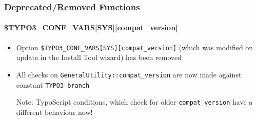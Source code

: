 %

\begin{frame}[fragile]
	\frametitle{Deprecated/Removed Functions}
	\framesubtitle{\$TYPO3\_CONF\_VARS[SYS][compat\_version]}

	\begin{itemize}

		\item Option \texttt{\$TYPO3\_CONF\_VARS[SYS][compat\_version]} (which was modified on
			update in the Install Tool wizard) has been removed

		\item All checks on \texttt{GeneralUtility::compat\_version} are now made against
			constant \texttt{TYPO3\_branch}

			\vspace{0.2cm}

			\begingroup
				\color{red}
					Note: TypoScript conditions, which check for older \texttt{compat\_version}
					have a different behaviour now!
			\endgroup

	\end{itemize}

\end{frame}


